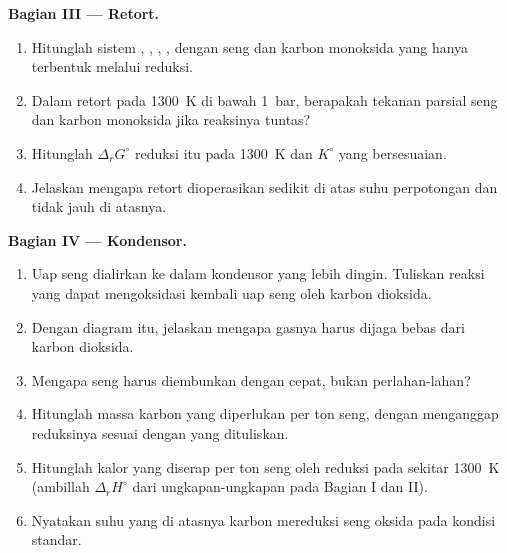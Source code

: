\begin{problem}
\medskip
\noindent\textbf{Bagian III --- Retort.}
\begin{enumerate}[resume]
  \item Hitunglah  sistem , , ,
        , dengan seng dan karbon monoksida yang hanya terbentuk
        melalui reduksi.
  \item Dalam retort pada \qty{1300}{K} di bawah \qty{1}{bar}, berapakah
        tekanan parsial seng dan karbon monoksida jika reaksinya tuntas?
  \item Hitunglah $\Delta_r G^\circ$ reduksi itu pada \qty{1300}{K} dan
        $K^\circ$ yang bersesuaian.
  \item Jelaskan mengapa retort dioperasikan sedikit di atas suhu
        perpotongan dan tidak jauh di atasnya.
\end{enumerate}

\medskip
\noindent\textbf{Bagian IV --- Kondensor.}
\begin{enumerate}[resume]
  \item Uap seng dialirkan ke dalam kondensor yang lebih dingin. Tuliskan
        reaksi yang dapat mengoksidasi kembali uap seng oleh karbon
        dioksida.
  \item Dengan diagram itu, jelaskan mengapa gasnya harus dijaga bebas
        dari karbon dioksida.
  \item Mengapa seng harus diembunkan dengan cepat, bukan perlahan-lahan?
  \item Hitunglah massa karbon yang diperlukan per ton seng, dengan
        menganggap reduksinya sesuai dengan yang dituliskan.
  \item Hitunglah kalor yang diserap per ton seng oleh reduksi pada sekitar
        \qty{1300}{K} (ambillah $\Delta_r H^\circ$ dari ungkapan-ungkapan
        pada Bagian I dan II).
  \item Nyatakan suhu yang di atasnya karbon mereduksi seng oksida pada
        kondisi standar.
\end{enumerate}
\end{problem}
